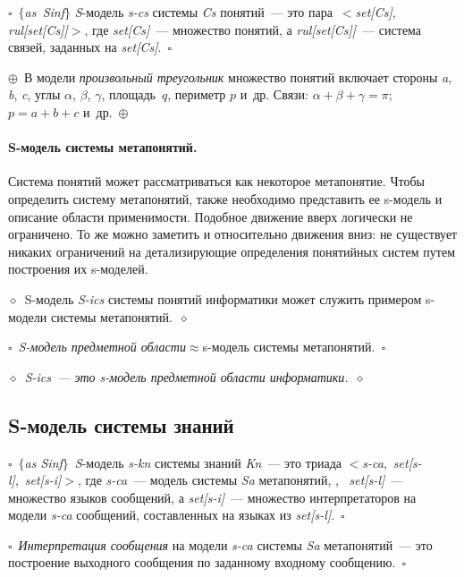 \begin{multicols}{2}
$\square$~$\{$\textit{as~Sinf}$\}$ \textit{S}-модель \textit{s-cs} системы
\textit{Cs} понятий~--- это пара~$<$\textit{set[Cs]}, \textit{rul[set[Cs]]}$>$, где
\textit{set[Cs]}~--- множество понятий, а \textit{rul[set[Cs]]}~--- сис\-те\-ма связей,
заданных на \textit{set[Cs]}.~$\square$

\noindent
$\oplus$~В модели \textit{произвольный треугольник} множество понятий
включает стороны \textit{a}, \textit{b}, \textit{c}, углы $\alpha$, $\beta$,
$\gamma$, площадь~$q$, периметр $p$ и~др. Связи: $\alpha +\beta+\gamma
=\pi$; $p=a+b+c$ и~др.~$\oplus$

\paragraph*{S-модель системы метапонятий.}Система понятий может
рассматриваться как некоторое метапонятие. Чтобы определить систему
метапонятий, также необходимо представить ее s-мо\-дель и описание области
применимости. Подобное движение вверх логически не ограничено. То же можно 
заметить и относительно движения вниз: не существует никаких ограничений на 
детализирующие определения понятийных систем путем построения их s-мо\-де\-лей.

\noindent
$\diamond$~S-модель \textit{S-ics} системы понятий
информатики может служить примером s-модели системы
метапонятий.~$\diamond$

\noindent
$\square$~\textit{S-модель предметной области}\;$\approx$\;s-модель
системы метапонятий.~$\square$

\noindent $\diamond$~\textit{S-ics~--- это s-мо\-дель предметной области 
информатики.}~$\diamond$

\subsection{S-модель системы знаний} %

\noindent
$\square$~$\{$\textit{as Sinf}$\}$~\textit{S}-модель \textit{s-kn} системы
знаний \textit{Kn}~--- это триада $<$\textit{s-ca},\ \textit{set[s-l]},\
\textit{set[s-i]}$>$, где \textit{s-ca}~--- модель системы \textit{Sa} метапонятий,
,~ \textit{set[s-l]}~--- множество языков сообщений, а \textit{set[s-i]}~---
множество интерпретаторов на модели \textit{s-ca} сообщений, составленных
на языках из \textit{set[s-l]}.~$\square$

\noindent
$\square$~\textit{Интерпретация сообщения} на модели \textit{s-ca} системы
\textit{Sa} метапонятий~--- это построение выходного сообщения по заданному
входному сообщению.~$\square$


\end{multicols}
